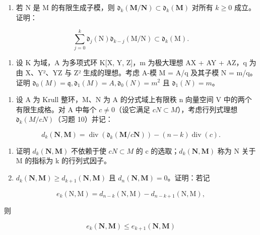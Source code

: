\begin{enumerate}
\def\labelenumi{(\alph{enumi})}
\setcounter{enumi}{5}
\tightlist
\item
  若 N 是 M 的有限生成子模，则 \(\mathfrak{d}_{k}(\mathbf{M}/\mathbf{N}) \subset \mathfrak{d}_{k}(\mathbf{M})\) 对所有 \(k \geqslant 0\) 成立。证明：
\end{enumerate}

\[
\sum_ {j = 0} ^ {k} \mathfrak {d} _ {j} (\mathrm{N}) \mathfrak {d} _ {k - j} (\mathrm{M} / \mathrm{N}) \subset \mathfrak {d} _ {k} (\mathrm{M}).
\]

\begin{enumerate}
\def\labelenumi{(\alph{enumi})}
\setcounter{enumi}{6}
\tightlist
\item
  设 K 为域，A 为多项式环 K{[}X, Y, Z{]}，m 为极大理想 AX + AY + AZ，q 为由 X、Y²、YZ 与 Z² 生成的理想。考虑 A-模 M = A/q 及其子模 N = m/q。证明 \(\mathfrak{d}_{0}(M) = \mathfrak{q}, \mathfrak{d}_{1}(M) = A, \mathfrak{d}_{0}(N) = m^{2}\) 且 \(\mathfrak{d}_{1}(N) = m\)。
\end{enumerate}

\begin{enumerate}
\def\labelenumi{\arabic{enumi}.}
\setcounter{enumi}{10}
\tightlist
\item
  设 A 为 Krull 整环，M、N 为 A 的分式域上有限秩 n 向量空间 V 中的两个有限生成格。对 A 中每个 \(c \neq 0\)（设它满足 \(cN \subset M\)），考虑行列式理想 \(\mathfrak{d}_{k}(M/cN)\)（习题 10）并记：
\end{enumerate}

\[
d _ {k} (\mathbf {N}, \mathbf {M}) = \operatorname{div} \left(\mathfrak {d} _ {k} (\mathbf {M} / c \mathbf {N})\right) - (n - k) \operatorname{div} (c).
\]

\begin{enumerate}
\def\labelenumi{(\alph{enumi})}
\item
  证明 \(d_{k}(\mathbf{N}, \mathbf{M})\) 不依赖于使 \(cN \subset M\) 的 c 的选取；\(d_{k}(\mathbf{N}, \mathbf{M})\) 称为 N 关于 M 的指标为 k 的行列式因子。
\item
  \(d_{k}(\mathbf{N},\mathbf{M})\geqslant d_{k + 1}(\mathbf{N},\mathbf{M})\) 且 \(d_{n}(\mathbf{N},\mathbf{M}) = 0\)。证明：若记
\end{enumerate}

\[
e _ {k} (\mathrm{N}, \mathrm{M}) = d _ {n - k} (\mathrm{N}, \mathrm{M}) - d _ {n - k + 1} (\mathrm{N}, \mathrm{M}),
\]

则

\[
e _ {k} (\mathbf {N}, \mathbf {M}) \leqslant e _ {k + 1} (\mathbf {N}, \mathbf {M})
\]

